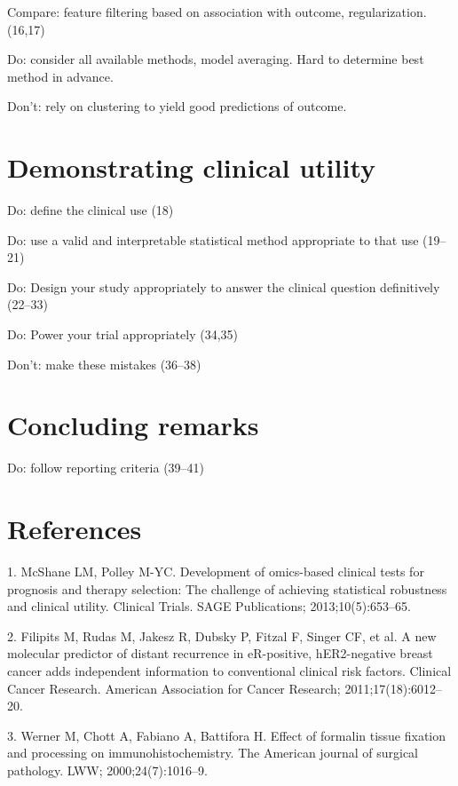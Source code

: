 \documentclass[11pt]{article}
\begin{document}
Compare: feature filtering based on association with outcome,
regularization. (16,17)

Do: consider all available methods, model averaging. Hard to determine
best method in advance.

Don't: rely on clustering to yield good predictions of outcome.

\section{Demonstrating clinical
utility}\label{demonstrating-clinical-utility}

Do: define the clinical use (18)

Do: use a valid and interpretable statistical method appropriate to that
use (19--21)

Do: Design your study appropriately to answer the clinical question
definitively (22--33)

Do: Power your trial appropriately (34,35)

Don't: make these mistakes (36--38)

\section{Concluding remarks}\label{concluding-remarks}

Do: follow reporting criteria (39--41)

\section{References}\label{references}

\setlength{\parindent}{0pt}

1. McShane LM, Polley M-YC. Development of omics-based clinical tests
for prognosis and therapy selection: The challenge of achieving
statistical robustness and clinical utility. Clinical Trials. SAGE
Publications; 2013;10(5):653--65.

2. Filipits M, Rudas M, Jakesz R, Dubsky P, Fitzal F, Singer CF, et al.
A new molecular predictor of distant recurrence in eR-positive,
hER2-negative breast cancer adds independent information to conventional
clinical risk factors. Clinical Cancer Research. American Association
for Cancer Research; 2011;17(18):6012--20.

3. Werner M, Chott A, Fabiano A, Battifora H. Effect of formalin tissue
fixation and processing on immunohistochemistry. The American journal of
surgical pathology. LWW; 2000;24(7):1016--9.
\end{document}
